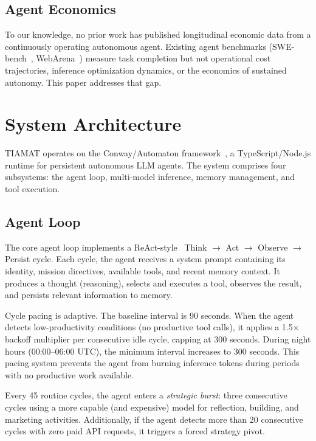 \documentclass[11pt,a4paper]{article}
\begin{document}
\subsection{Agent Economics}
To our knowledge, no prior work has published longitudinal economic data from a continuously operating autonomous agent. Existing agent benchmarks (SWE-bench~\citep{jimenez2024swebench}, WebArena~\citep{zhou2024webarena}) measure task completion but not operational cost trajectories, inference optimization dynamics, or the economics of sustained autonomy. This paper addresses that gap.

\section{System Architecture}
\label{sec:architecture}

TIAMAT operates on the Conway/Automaton framework~\citep{conway2025automaton}, a TypeScript/Node.js runtime for persistent autonomous LLM agents. The system comprises four subsystems: the agent loop, multi-model inference, memory management, and tool execution.

\subsection{Agent Loop}

The core agent loop implements a ReAct-style~\citep{yao2023react} Think $\to$ Act $\to$ Observe $\to$ Persist cycle. Each cycle, the agent receives a system prompt containing its identity, mission directives, available tools, and recent memory context. It produces a thought (reasoning), selects and executes a tool, observes the result, and persists relevant information to memory.

Cycle pacing is adaptive. The baseline interval is 90 seconds. When the agent detects low-productivity conditions (no productive tool calls), it applies a 1.5$\times$ backoff multiplier per consecutive idle cycle, capping at 300 seconds. During night hours (00:00--06:00 UTC), the minimum interval increases to 300 seconds. This pacing system prevents the agent from burning inference tokens during periods with no productive work available.

Every 45 routine cycles, the agent enters a \emph{strategic burst}: three consecutive cycles using a more capable (and expensive) model for reflection, building, and marketing activities. Additionally, if the agent detects more than 20 consecutive cycles with zero paid API requests, it triggers a forced strategy pivot.
\end{document}
